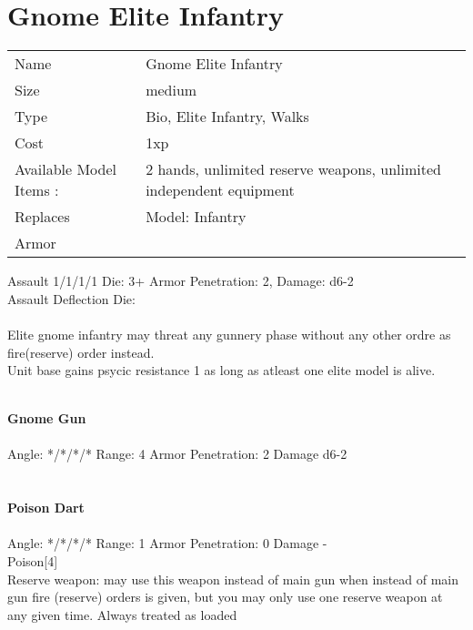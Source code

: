






\pagebreak

\section{ Gnome Elite Infantry }

\begin{tabular}{ll}
  Name & Gnome Elite Infantry \\
  Size & medium\\
  Type & Bio, Elite Infantry, Walks\\
  Cost & 1xp\\
  Available Model Items : &2 hands, unlimited reserve weapons, unlimited independent equipment\\
  Replaces & Model: Infantry\\
  Armor & 
\end{tabular}



Assault 1/1/1/1 Die: 3+ Armor Penetration: 2, Damage: d6-2 \\
Assault Deflection  Die: \\

\ \\

Elite gnome infantry may threat any gunnery phase without any other ordre as fire(reserve) order instead.\\ Unit base gains psycic resistance 1 as long as atleast one elite model is alive.

\ \\
{\bf Gnome Gun } \\
\ \\
Angle: */*/*/* Range: 4 Armor Penetration: 2 Damage d6-2 \\
\indent  \\



\ \\
{\bf Poison Dart } \\
\ \\
Angle: */*/*/* Range: 1 Armor Penetration: 0 Damage - \\
\indent Poison[4]\\ Reserve weapon: may use this weapon instead of main gun when instead of main gun fire (reserve) orders is given, but you may only use one reserve weapon at any given time. Always treated as loaded \\



